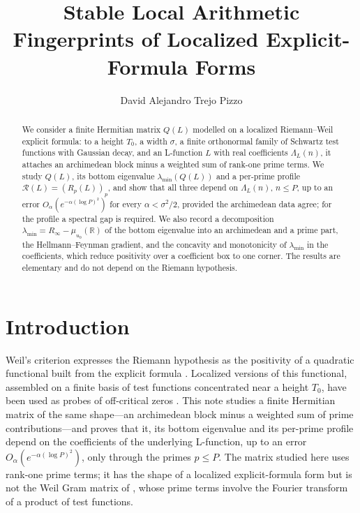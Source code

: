 \documentclass[11pt]{amsart}
\title[Stable Arithmetic Fingerprints]{Stable Local Arithmetic Fingerprints of Localized Explicit-Formula Forms}
\author{David Alejandro Trejo Pizzo}
\theoremstyle{definition}
\theoremstyle{remark}
\newcommand{\lmin}{\lambda_{\min}}
\newcommand{\Rprof}{\mathcal R}
\begin{document}
\begin{abstract}
We consider a finite Hermitian matrix $Q(L)$ modelled on a localized Riemann--Weil explicit formula: to a
height $T_0$, a width $\sigma$, a finite orthonormal family of Schwartz test functions with Gaussian decay,
and an L-function $L$ with real coefficients $\Lambda_L(n)$, it attaches an archimedean block minus a
weighted sum of rank-one prime terms. We study $Q(L)$, its bottom eigenvalue $\lmin(Q(L))$ and a per-prime
profile $\Rprof(L)=(R_p(L))_p$, and show that all three depend on $\Lambda_L(n)$, $n\le P$, up to an error
$O_\alpha(e^{-\alpha(\log P)^2})$ for every $\alpha<\sigma^2/2$, provided the archimedean data agree; for the
profile a spectral gap is required. We also record a decomposition $\lmin=R_\infty-\mu_{u_0}(\mathbb R)$ of
the bottom eigenvalue into an archimedean and a prime part, the Hellmann--Feynman gradient, and the concavity
and monotonicity of $\lmin$ in the coefficients, which reduce positivity over a coefficient box to one
corner. The results are elementary and do not depend on the Riemann hypothesis.
\end{abstract}

\maketitle

\tableofcontents
\newpage

\section{Introduction}\label{sec:intro}
Weil's criterion expresses the Riemann hypothesis as the positivity of a quadratic functional built from
the explicit formula \cite{Weil}. Localized versions of this functional, assembled on a finite basis of
test functions concentrated near a height $T_0$, have been used as probes of off-critical zeros \cite{P7}.
This note studies a finite Hermitian matrix of the same shape---an archimedean block minus a weighted sum of
prime contributions---and proves that it, its bottom eigenvalue and its per-prime profile depend on the
coefficients of the underlying L-function, up to an error $O_\alpha(e^{-\alpha(\log P)^2})$, only through
the primes $p\le P$. The matrix studied here uses rank-one prime terms; it has the shape of a localized
explicit-formula form but is not the Weil Gram matrix of \cite{P7}, whose prime terms involve the Fourier
transform of a product of test functions.
\end{document}
